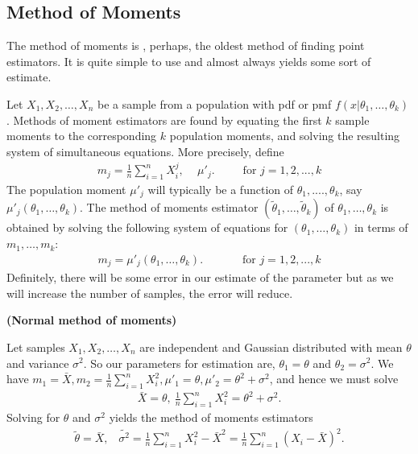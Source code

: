 \documentclass[a4paper,english,12pt]{article}
\begin{document}
\subsection{Method of Moments}
The method of moments is , perhaps, the oldest method of finding point estimators. It is quite simple to use and almost always yields some sort of estimate.
\par Let $X_1,X_2,\dots,X_n$ be a sample from a population with pdf or pmf $f(x|\theta_1,\dots,\theta_k)$. Methods of moment estimators are found by equating the first $k$ sample moments to the corresponding $k$ population moments, and solving the resulting system of simultaneous equations. More precisely, define
\begin{align}
 m_j = \frac{1}{n}\sum\limits_{i=1}^n{X^j_i}, \,\,\,\,\,\,\,\mu'_j.\,\,\,\,\,\,\,\,\,\,\,\,\,\,\,\mathrm{for}\,\, j = 1,2,...,k
\end{align}  
The population moment $\mu'_j$ will typically be a function of $\theta_1,....,\theta_k$, say $\mu'_j(\theta_1,\dots,\theta_k)$. The method of moments estimator $(\tilde\theta_1,\dots,\tilde\theta_k)$ of $\theta_1,\dots,\theta_k$ is obtained by solving the following system of equations for $(\theta_1,\dots,\theta_k)$ in terms of $m_1,\dots,m_k$:
\begin{align}
m_j = \mu'_j(\theta_1,\dots,\theta_k). \,\,\,\,\,\,\,\,\,\,\,\,\,\,\,\,\,\,\,\,\,\mathrm{for}\,\, j = 1,2,...,k
\end{align} 
Definitely, there will be some error in our estimate of the parameter but as we will increase the number of samples, the error will reduce.
\begin{exmp}\textbf{(Normal method of moments)}
\par Let samples $X_1,X_2,\dots,X_n$ are independent and Gaussian distributed with mean $\theta$ and variance $\sigma^2$. So our parameters for estimation are, $\theta_1=\theta$ and $\theta_2=\sigma^2$. We have $m_1 = \bar{X}, m_2 = \frac{1}{n}\sum_{i=1}^n{X^2_i}, \mu'_1=\theta, \mu'_2 = \theta^2 + \sigma^2 $, and hence we must solve 
\begin{align}
\bar{X}=\theta,~\frac{1}{n}\sum_{i=1}^n{X^2_i} = \theta^2 + \sigma^2.
\end{align} 
Solving for $\theta$ and $\sigma^2$ yields the method of moments estimators
\begin{align}
\tilde{\theta} = \bar{X},\,\,\,\,\,\tilde{\sigma^2}=\frac{1}{n}\sum_{i=1}^n{X^2_i} - \bar{X}^2=\frac{1}{n}\sum_{i=1}^n{(X_i - \bar{X})}^2.
\end{align} 
\end{exmp}
\end{document}
